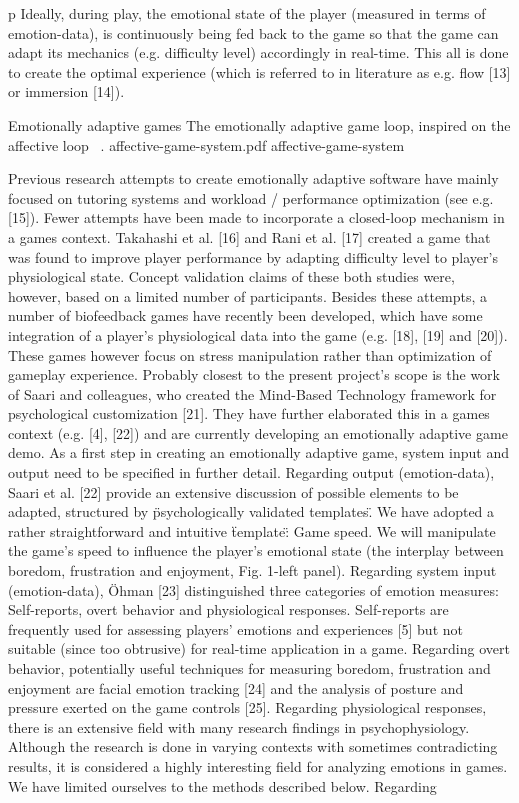 p Ideally, during play, the emotional state of the player (measured in terms of emotion-data), is continuously being fed back to the game so that the game can adapt its mechanics (e.g. difficulty level) accordingly in real-time. This all is done to create the optimal experience (which is referred to in literature as e.g. flow [13] or immersion [14]).

\img
{Emotionally adaptive games}
{The emotionally adaptive game loop, inspired on the affective loop ~\cite{sundstrom2005user}.}
{affective-game-system.pdf}
{affective-game-system}

Previous research attempts to create emotionally adaptive software have mainly focused on tutoring systems and workload / performance optimization (see e.g. [15]). Fewer attempts have been made to incorporate a closed-loop mechanism in a games context. Takahashi et al. [16] and Rani et al. [17] created a game that was found to improve player performance by adapting difficulty level to player's physiological state. Concept validation claims of these both studies were, however, based on a limited number of participants. Besides these attempts, a number of biofeedback games have recently been developed, which have some integration of a player's physiological data into the game (e.g. [18], [19] and [20]). These games however focus on stress manipulation rather than optimization of gameplay experience. Probably closest to the present project's scope is the work of Saari and colleagues, who created the Mind-Based Technology framework for psychological customization [21]. They have further elaborated this in a games context (e.g. [4], [22]) and are currently developing an emotionally adaptive game demo. As a first step in creating an emotionally adaptive game, system input and output need to be specified in further detail. Regarding output (emotion-data), Saari et al. [22] provide an extensive discussion of possible elements to be adapted, structured by \"psychologically validated templates\". We have adopted a rather straightforward and intuitive \"template\": Game speed. We will manipulate the game's speed to influence the player's emotional state (the interplay between boredom, frustration and enjoyment, Fig. 1-left panel). Regarding system input (emotion-data), Öhman [23] distinguished three categories of emotion measures: Self-reports, overt behavior and physiological responses. Self-reports are frequently used for assessing players' emotions and experiences [5] but not suitable (since too obtrusive) for real-time application in a game. Regarding overt behavior, potentially useful techniques for measuring boredom, frustration and enjoyment are facial emotion tracking [24] and the analysis of posture and pressure exerted on the game controls [25]. Regarding physiological responses, there is an extensive field with many research findings in psychophysiology. Although the research is done in varying contexts with sometimes contradicting results, it is considered a highly interesting field for analyzing emotions in games. We have limited ourselves to the methods described below. Regarding 